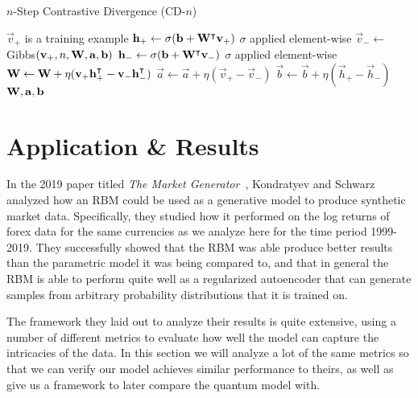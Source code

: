 \begin{algorithm}
    \caption{$n$-Step Contrastive Divergence (CD-$n$)}
\begin{algorithmic}[1]
        \Comment $\vec{v}_+$ is a training example
        \State $\mathbf{h}_+ \gets \sigma(\mathbf{b} + \mathbf{W}^\intercal\mathbf{v}_+)$
            \Comment $\sigma$ applied element-wise
        \State $\vec{v}_- \gets$ Gibbs$(\mathbf{v}_+,n,\mathbf{W},\mathbf{a},\mathbf{b})$
        \State $\mathbf{h}_- \gets \sigma(\mathbf{b} + \mathbf{W}^\intercal\mathbf{v}_-)$
            \Comment $\sigma$ applied element-wise
        \State $\mathbf{W} \gets \mathbf{W} + \eta(\mathbf{v}_+ \mathbf{h}_+^\intercal - \mathbf{v}_- \mathbf{h}_-^\intercal)$
        \State $\vec{a} \gets \vec{a} + \eta(\vec{v}_+ - \vec{v}_-)$
        \State $\vec{b} \gets \vec{b} + \eta(\vec{h}_+ - \vec{h}_-)$
        \State \Return $\mathbf{W}, \mathbf{a}, \mathbf{b}$
    \EndProcedure
\end{algorithmic}
\label{alg:CDn}
\end{algorithm}


\section{Application \& Results}
In the 2019 paper titled \textit{The Market Generator}~\cite{kondratyev_2019}, Kondratyev and Schwarz analyzed how an RBM could be used as a generative model to produce synthetic market data.
Specifically, they studied how it performed on the log returns of forex data for the same currencies as we analyze here for the time period 1999-2019.
They successfully showed that the RBM was able produce better results than the parametric model it was being compared to, and that in general the RBM is able to perform quite well as a regularized autoencoder that can generate samples from arbitrary probability distributions that it is trained on.

The framework they laid out to analyze their results is quite extensive, using a number of different metrics to evaluate how well the model can capture the intricacies of the data.
In this section we will analyze a lot of the same metrics so that we can verify our model achieves similar performance to theirs, as well as give us a framework to later compare the quantum model with.

